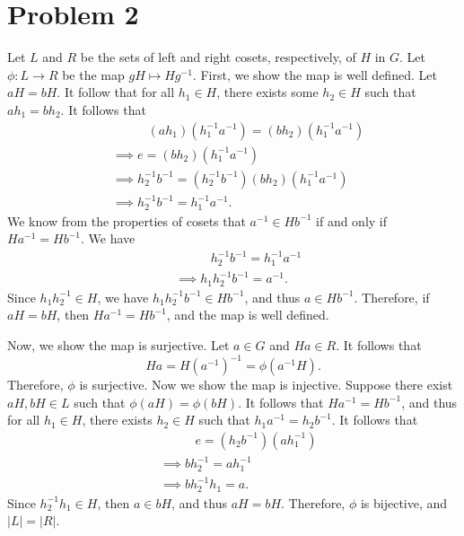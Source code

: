 \documentclass[11pt, letterpaper]{article}
\begin{document}
\section*{Problem 2}
\begin{solution}
Let $L$ and $R$ be the sets of left and right cosets, respectively, of $H$ in $G$. Let $\phi : L \to R$ be the map  $gH\mapsto Hg^{-1}$. First, we show the map is well defined. Let $aH=bH$. It follow that for all $h_1\in H$, there exists some $h_2\in H$ such that $ah_1=bh_2$. It follows that
\begin{align*}
	&\qquad\;\;\; \left(ah_1\right)\left(h_1^{-1}a^{-1}\right)=\left(bh_2\right)\left(h_1^{-1}a^{-1}\right)\\
	&\implies e=\left(bh_2\right)\left(h_1^{-1}a^{-1}\right)\\
	&\implies h_2^{-1}b^{-1}=\left(h_2^{-1}b^{-1}\right)\left(bh_2\right)\left(h_1^{-1}a^{-1}\right)\\
	&\implies h_2^{-1}b^{-1}=h_1^{-1}a^{-1}
.\end{align*}
We know from the properties of cosets that $a^{-1}\in Hb^{-1}$ if and only if $Ha^{-1}=Hb^{-1}$. We have
\begin{align*}
	&\qquad\;\;\; h_2^{-1}b^{-1}=h_1^{-1}a^{-1}\\
	&\implies h_1h_2^{-1}b^{-1}=a^{-1}
.\end{align*}
Since $h_1h_2^{-1}\in H$, we have $h_1h_2^{-1}b^{-1}\in Hb^{-1}$, and thus $a\in Hb^{-1}$. Therefore, if $aH=bH$, then $Ha^{-1}=Hb^{-1}$, and the map is well defined.

Now, we show the map is surjective. Let $a\in G$ and $Ha\in R$. It follows that
\[
	Ha=H\left( a^{-1} \right) ^{-1}=\phi \left( a^{-1}H \right) 
.\]
Therefore, $\phi $ is surjective. Now we show the map is injective. Suppose there exist $aH,bH\in L$ such that $\phi (aH)=\phi (bH)$. It follows that $Ha^{-1}=Hb^{-1}$, and thus for all $h_1\in H$, there exists $h_2\in H$ such that $h_1a^{-1}=h_2b^{-1}$. It follows that
\begin{align*}
	&\qquad\;\;\; e=\left(h_2b^{-1}\right) \left(ah_1^{-1}\right)\\
	&\implies bh_2^{-1}=ah_1^{-1}\\
	&\implies bh_2^{-1}h_1=a
.\end{align*}
Since $h_2^{-1}h_1\in H$, then $a\in bH$, and thus $aH=bH$. Therefore, $\phi $ is bijective, and $\left| L \right| =\left| R \right| $.
\end{solution}
\end{document}
